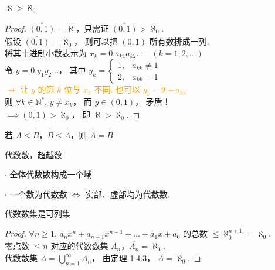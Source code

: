 \begin{theorem}
    $\aleph > \aleph_0$
\end{theorem}
\begin{proof}
$\overline{\overline{(0, 1)}} = \aleph$，只需证 $\overline{\overline{(0, 1)}} > \aleph_0$. \\
假设 $\overline{\overline{(0, 1)}} = \aleph_0$， 则可以把 $(0, 1)$ 所有数排成一列. \\
将其十进制小数表示为 $x_k = 0.a_{k1}a_{k2}\dots \quad (k=1, 2, \dots)$ \\
令 $y = 0.y_1y_2\dots$， 其中 $y_k = \begin{cases} 1, & a_{kk} \neq 1 \\ 2, & a_{kk} = 1 \end{cases}$ \\
\textcolor{orange}{$\to$ 让 $y$ 的第 $k$ 位与 $x_k$ 不同. 也可以 $y_k = 9 - a_{kk}$} \\
则 $\forall k \in \mathbb{N}^*$, $y \neq x_k$， 而 $y \in (0, 1)$， 矛盾！ \\
$\implies \overline{\overline{(0, 1)}} > \aleph_0$， 即 $\aleph > \aleph_0$.
\end{proof}

\begin{theorem}[Bernstein 定理]
    若 $\overline{\overline{A}} \le \overline{\overline{B}}$，$\overline{\overline{B}} \le \overline{\overline{A}}$，则 $\overline{\overline{A}} = \overline{\overline{B}}$
\end{theorem}

代数数，超越数 

{$\cdot$ 全体代数数构成一个域.} 

{$\cdot$ 一个数为代数数 $\iff$ 实部、虚部均为代数数.}

\begin{theorem}
    代数数集是可列集
\end{theorem}
\begin{proof}
$\forall n \ge 1$, $a_nx^n + a_{n-1}x^{n-1} + \dots + a_1x + a_0$ 的总数 $\le \aleph_0^{n+1} = \aleph_0$. \\
零点数 $\le n$ 对应的代数数集 $A_n$，$\overline{\overline{A_n}} = \aleph_0$. \\
代数数集 $A = \bigcup_{n=1}^\infty A_n$， 由定理 1.4.3， $\overline{\overline{A}} = \aleph_0$.
\end{proof}

